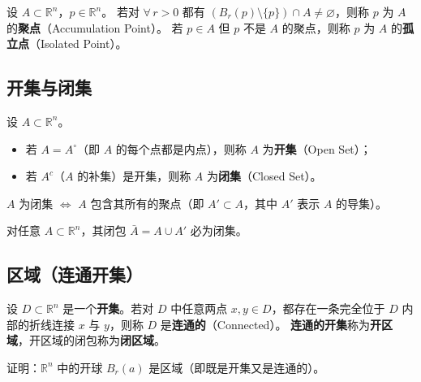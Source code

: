 \documentclass[lang=cn,11pt]{elegantbook}
\begin{document}
\begin{definition}[聚点与孤立点] \label{def:accumulation-point}
设 $A\subset\mathbb R^n$，$p\in\mathbb R^n$。
若对 $\forall\,r>0$ 都有 $(B_r(p)\setminus\{p\})\cap A\neq\varnothing$，则称 $p$ 为 $A$ 的\textbf{聚点}（Accumulation Point）。
若 $p\in A$ 但 $p$ 不是 $A$ 的聚点，则称 $p$ 为 $A$ 的\textbf{孤立点}（Isolated Point）。
\end{definition}


\subsection{开集与闭集}

\begin{definition}[开集与闭集] \label{def:open-set}
设 $A\subset\mathbb R^n$。
\begin{itemize}
  \item 若 $A=A^\circ$（即 $A$ 的每个点都是内点），则称 $A$ 为\textbf{开集}（Open Set）；
  \item 若 $A^c$（$A$ 的补集）是开集，则称 $A$ 为\textbf{闭集}（Closed Set）。
\end{itemize}
\end{definition}

\begin{theorem}[闭集的聚点刻画] \label{thm:closed-equiv}
$A$ 为闭集 $\Longleftrightarrow$ $A$ 包含其所有的聚点（即 $A'\subset A$，其中 $A'$ 表示 $A$ 的导集）。
\end{theorem}

\begin{theorem}[闭包是闭集] \label{thm:closure-closed}
对任意 $A\subset\mathbb R^n$，其闭包 $\bar A=A\cup A'$ 必为闭集。
\end{theorem}


\subsection{区域（连通开集）}

\begin{definition} \label{def:region}
设 $D\subset\mathbb R^n$ 是一个\textbf{开集}。若对 $D$ 中任意两点 $x,y\in D$，都存在一条完全位于 $D$ 内部的折线连接 $x$ 与 $y$，则称 $D$ 是\textbf{连通的}（Connected）。
\textbf{连通的开集}称为\textbf{开区域}，开区域的闭包称为\textbf{闭区域}。
\end{definition}

\begin{exercise}[开球是区域] \label{ex:ball-connected}
证明：$\mathbb R^n$ 中的开球 $B_r(a)$ 是区域（即既是开集又是连通的）。
\end{exercise}
\end{document}
